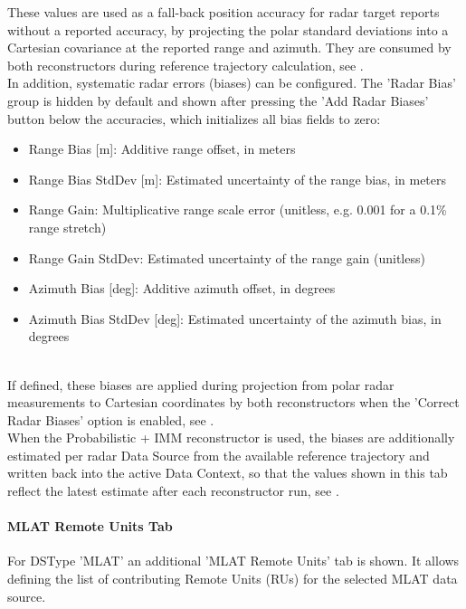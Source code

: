 These values are used as a fall-back position accuracy for radar target reports without a reported accuracy, by projecting the polar standard deviations into a Cartesian covariance at the reported range and azimuth. They are consumed by both reconstructors during reference trajectory calculation, see . \\

In addition, systematic radar errors (biases) can be configured. The 'Radar Bias' group is hidden by default and shown after pressing the 'Add Radar Biases' button below the accuracies, which initializes all bias fields to zero:

\begin{itemize}
\item Range Bias [m]: Additive range offset, in meters
\item Range Bias StdDev [m]: Estimated uncertainty of the range bias, in meters
\item Range Gain: Multiplicative range scale error (unitless, e.g. 0.001 for a 0.1\% range stretch)
\item Range Gain StdDev: Estimated uncertainty of the range gain (unitless)
\item Azimuth Bias [deg]: Additive azimuth offset, in degrees
\item Azimuth Bias StdDev [deg]: Estimated uncertainty of the azimuth bias, in degrees
\end{itemize}
\ \\

If defined, these biases are applied during projection from polar radar measurements to Cartesian coordinates by both reconstructors when the 'Correct Radar Biases' option is enabled, see . \\

When the Probabilistic + IMM reconstructor is used, the biases are additionally estimated per radar Data Source from the available reference trajectory and written back into the active Data Context, so that the values shown in this tab reflect the latest estimate after each reconstructor run, see . \\

\paragraph{MLAT Remote Units Tab}
\label{sec:ui_configure_ds_mlat_rus}

For DSType 'MLAT' an additional 'MLAT Remote Units' tab is shown. It allows defining the list of contributing Remote Units (RUs) for the selected MLAT data source. \\

